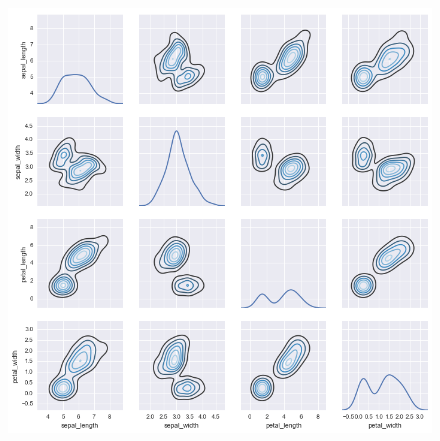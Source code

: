 \documentclass{beamer}
\begin{document}
\begin{frame}[fragile]
\begin{figure}
\centering
\includegraphics[width=0.7\linewidth]{images/distributions_44_1}
\end{figure}
\end{frame}
\end{document}
